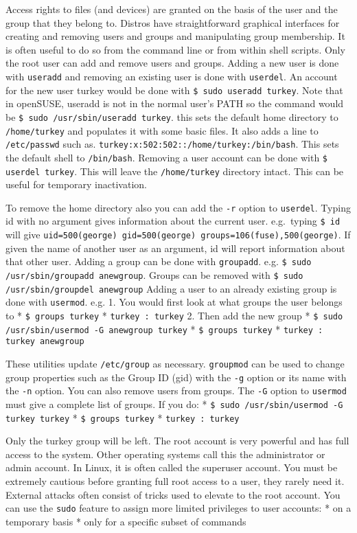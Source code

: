 Access rights to files (and devices) are granted on the basis of the
user and the group that they belong to. Distros have straightforward
graphical interfaces for creating and removing users and groups and
manipulating group membership. It is often useful to do so from the
command line or from within shell scripts. Only the root user can add
and remove users and groups. Adding a new user is done with
\texttt{useradd} and removing an existing user is done with
\texttt{userdel}. An account for the new user turkey would be done with
\texttt{\$ sudo useradd turkey}. Note that in openSUSE, useradd is not
in the normal user's PATH so the command would be
\texttt{\$ sudo /usr/sbin/useradd turkey}. this sets the default home
directory to \texttt{/home/turkey} and populates it with some basic
files. It also adds a line to \texttt{/etc/passwd} such as.
\texttt{turkey:x:502:502::/home/turkey:/bin/bash}. This sets the default
shell to \texttt{/bin/bash}. Removing a user account can be done with
\texttt{\$ userdel turkey}. This will leave the \texttt{/home/turkey}
directory intact. This can be useful for temporary inactivation.

To remove the home directory also you can add the \texttt{-r} option to
\texttt{userdel}. Typing id with no argument gives information about the
current user. e.g.~typing \texttt{\$ id} will give
\texttt{uid=500(george) gid=500(george) groups=106(fuse),500(george)}.
If given the name of another user as an argument, id will report
information about that other user. Adding a group can be done with
\texttt{groupadd}. e.g. \texttt{\$ sudo /usr/sbin/groupadd anewgroup}.
Groups can be removed with \texttt{\$ sudo /usr/sbin/groupdel anewgroup}
Adding a user to an already existing group is done with
\texttt{usermod}. e.g. 1. You would first look at what groups the user
belongs to * \texttt{\$ groups turkey} * \texttt{turkey : turkey} 2.
Then add the new group *
\texttt{\$ sudo /usr/sbin/usermod -G anewgroup turkey} *
\texttt{\$ groups turkey} * \texttt{turkey : turkey anewgroup}

These utilities update \texttt{/etc/group} as necessary.
\texttt{groupmod} can be used to change group properties such as the
Group ID (gid) with the \texttt{-g} option or its name with the
\texttt{-n} option. You can also remove users from groups. The
\texttt{-G} option to \texttt{usermod} must give a complete list of
groups. If you do: * \texttt{\$ sudo /usr/sbin/usermod -G turkey turkey}
* \texttt{\$ groups turkey} * \texttt{turkey : turkey}

Only the turkey group will be left. The root account is very powerful
and has full access to the system. Other operating systems call this the
administrator or admin account. In Linux, it is often called the
superuser account. You must be extremely cautious before granting full
root access to a user, they rarely need it. External attacks often
consist of tricks used to elevate to the root account. You can use the
\texttt{sudo} feature to assign more limited privileges to user
accounts: * on a temporary basis * only for a specific subset of
commands

